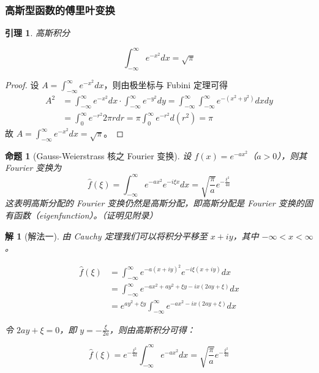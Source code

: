 \documentclass[12pt,a4paper]{article}
\theoremstyle{plain}
\newtheorem{lemma}[theorem]{引理}
\newtheorem{proposition}[theorem]{命题}
\newtheorem{solution}{解}
\theoremstyle{definition}
\theoremstyle{remark}
\begin{document}
\subsubsection{高斯型函数的傅里叶变换}
\begin{lemma}高斯积分
	
	\[
	\int_{-\infty}^{\infty} e^{-x^2} dx = \sqrt{\pi}
	\]
\end{lemma}

\begin{proof}
 设 \( A = \int_{-\infty}^{\infty} e^{-x^2} dx \)，则由极坐标与 Fubini 定理可得
\[
\begin{aligned}
	A^2 &= \int_{-\infty}^{\infty} e^{-x^2} dx \cdot \int_{-\infty}^{\infty} e^{-y^2} dy = \int_{-\infty}^{\infty} \int_{-\infty}^{\infty} e^{-(x^2 + y^2)} dx dy \\
	&= \int_{0}^{\infty} e^{-r^2} 2\pi r dr = \pi \int_{0}^{\infty} e^{-r^2} d(r^2) = \pi
\end{aligned}
\]
故 \( A = \int_{-\infty}^{\infty} e^{-x^2} dx = \sqrt{\pi} \)。
\end{proof}

\begin{proposition}[Gauss-Weierstrass 核之 Fourier 变换]
	设 \( f(x) = e^{-a x^2} \)（\( a > 0 \)），则其 Fourier 变换为
	\[
	\widehat{f}(\xi) = \int_{-\infty}^{\infty} e^{-a x^2} e^{-i \xi x} dx = \sqrt{\frac{\pi}{a}} e^{-\frac{\xi^2}{4a}}
	\]
	这表明高斯分配的 Fourier 变换仍然是高斯分配，即高斯分配是 Fourier 变换的固有函数（eigenfunction）。（证明见附录）
\end{proposition}

\begin{solution}[解法一]
	由 Cauchy 定理我们可以将积分平移至 \( x + iy \)，其中 \( -\infty < x < \infty \)。
	
	\[
	\begin{aligned}
		\widehat{f}(\xi) &= \int_{-\infty}^{\infty} e^{-a(x+iy)^2} e^{-i\xi(x+iy)} dx \\
		&= \int_{-\infty}^{\infty} e^{-ax^2 + ay^2 + \xi y - ix(2ay + \xi)} dx \\
		&= e^{ay^2 + \xi y} \int_{-\infty}^{\infty} e^{-ax^2 - ix(2ay + \xi)} dx
	\end{aligned}
	\]
	
	令 \( 2ay + \xi = 0 \)，即 \( y = -\frac{\xi}{2a} \)，则由高斯积分可得：
	
	\[
	\widehat{f}(\xi) = e^{-\frac{\xi^2}{4a}} \int_{-\infty}^{\infty} e^{-ax^2} dx = \sqrt{\frac{\pi}{a}} e^{-\frac{\xi^2}{4a}}
	\]
	
\end{solution}
\end{document}
